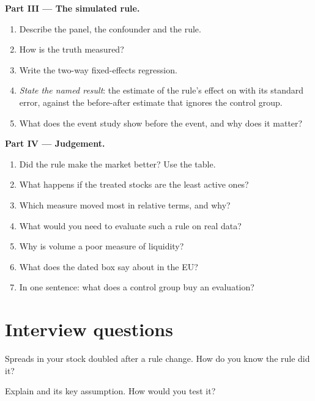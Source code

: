 \begin{problem}
\medskip\noindent\textbf{Part III --- The simulated rule.}
\begin{enumerate}[resume]
\item Describe the panel, the confounder and the rule.
\item How is the truth measured?
\item Write the two-way fixed-effects regression.
\item \emph{State the named result}: the  estimate of the rule's effect on  with its standard error, against the
before-after estimate that ignores the control group.
\item What does the event study show before the event, and why does it matter?
\end{enumerate}

\medskip\noindent\textbf{Part IV --- Judgement.}
\begin{enumerate}[resume]
\item Did the rule make the market better? Use the table.
\item What happens if the treated stocks are the least active ones?
\item Which measure moved most in relative terms, and why?
\item What would you need to evaluate such a rule on real data?
\item Why is volume a poor measure of liquidity?
\item What does the dated box say about  in the EU?
\item In one sentence: what does a control group buy an evaluation?
\end{enumerate}
\end{problem}

\section{Interview questions}

\begin{interviewq}\label{iq:mx:market-quality-and-regulation:1}
Spreads in your stock doubled after a rule change. How do you know the rule did it?
\end{interviewq}

\begin{interviewq}\label{iq:mx:market-quality-and-regulation:2}
Explain  and its key assumption. How would you test it?
\end{interviewq}

